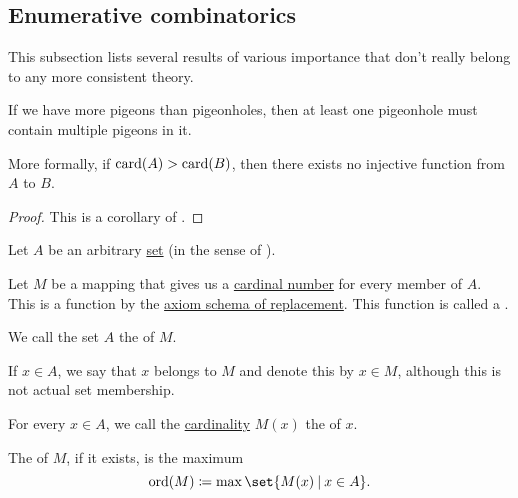 \subsection{Enumerative combinatorics}\label{subsec:enumerative_combinatorics}

This subsection lists several results of various importance that don't really belong to any more consistent theory.

\begin{theorem}\label{def:pigeonhole_principle}
  If we have more pigeons than pigeonholes, then at least one pigeonhole must contain multiple pigeons in it.

  More formally, if \( \operatorname{card}(A) > \operatorname{card}(B) \), then there exists no injective function from \( A \) to \( B \).
\end{theorem}
\begin{proof}
  This is a corollary of .
\end{proof}

\begin{definition}\label{def:multiset}
  Let \( A \) be an arbitrary \hyperref[def:set]{set} (in the sense of \hyperref[def:zfc]{}).

  Let \( M \) be a mapping that gives us a \hyperref[def:cardinal]{cardinal number} for every member of \( A \). This is a function by the \hyperref[def:zfc/replacement]{axiom schema of replacement}. This function is called a .

  \begin{thmenum}
     We call the set \( A \) the  of \( M \).

    If \( x \in A \), we say that \( x \) belongs to \( M \) and denote this by \( x \in M \), although this is not actual set membership.

     For every \( x \in A \), we call the \hyperref[def:cardinality_existence]{cardinality} \( M(x) \) the  of \( x \).

     The  of \( M \), if it exists, is the maximum
    \begin{equation*}
      \ord(M) \coloneqq \max\set{ M(x) \given x \in A }.
    \end{equation*}
  \end{thmenum}
\end{definition}

